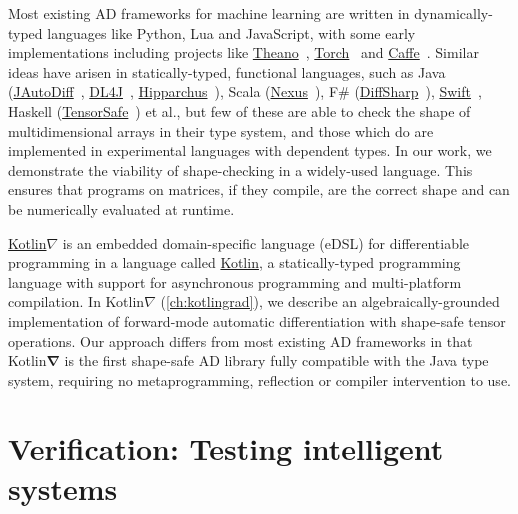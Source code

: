 Most existing AD frameworks for machine learning are written in dynamically-typed languages like Python, Lua and JavaScript, with some early implementations including projects like \href{http://deeplearning.net/software/theano/}{Theano}~\citep{bergstra2010theano}, \href{http://torch.ch/}{Torch}~\citep{collobert2002torch} and \href{https://caffe.berkeleyvision.org/}{Caffe}~\citep{jia2014caffe}. Similar ideas have arisen in statically-typed, functional languages, such as Java (\href{https://github.com/uniker9/JAutoDiff}{JAutoDiff}~\citep{nureki2012jautodiff}, \href{https://deeplearning4j.org/}{DL4J}~\citep{team2016dl4j}, \href{https://github.com/Hipparchus-Math/hipparchus}{Hipparchus}~\citep{andrea2016automatic}), Scala (\href{https://tongfei.me/nexus/}{Nexus}~\citep{chen2017typesafe}), F\# (\href{http://diffsharp.github.io/DiffSharp/}{DiffSharp}~\citep{baydin2015diffsharp}), \href{https://www.tensorflow.org/swift}{Swift}~\citep{lattner2018tensorflow}, Haskell (\href{https://github.com/leopiney/tensor-safe}{TensorSafe}~\citep{pineyro2019structure}) et al., but few of these are able to check the shape of multidimensional arrays in their type system, and those which do are implemented in experimental languages with dependent types. In our work, we demonstrate the viability of shape-checking in a widely-used language. This ensures that programs on matrices, if they compile, are the correct shape and can be numerically evaluated at runtime.

\href{https://github.com/breandan/kotlingrad/}{Kotlin$\nabla$} is an embedded domain-specific language (eDSL) for differentiable programming in a language called \href{https://kotlinlang.org}{Kotlin}, a statically-typed programming language with support for asynchronous programming and multi-platform compilation. In Kotlin$\nabla$ (\autoref{ch:kotlingrad}), we describe an algebraically-grounded implementation of forward-mode automatic differentiation with shape-safe tensor operations. Our approach differs from most existing AD frameworks in that Kotlin$\mathbf{\nabla}$ is the first shape-safe AD library fully compatible with the Java type system, requiring no metaprogramming, reflection or compiler intervention to use.

\section{Verification: Testing intelligent systems}

